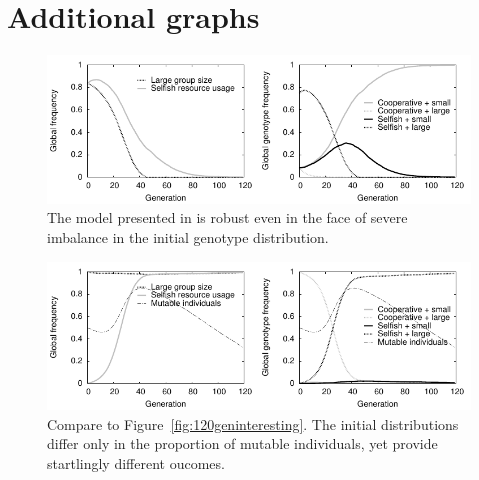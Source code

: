\documentclass[11pt]{article}
\begin{document}
\section{Additional graphs}
\label{app:graphs}
\vspace{-.5cm}
\begin{figure}[!ht]
  \centering
  \includegraphics{unevenplot.pdf}
  \caption{The model presented in \citet{orig} is robust even in the face of severe imbalance in the initial genotype distribution.}
  \label{fig:unevenplot}
\end{figure}
\vspace{-.5cm}
\begin{figure}[!ht]
  \centering
  \includegraphics{further1.pdf}
  \caption{Compare to Figure~\ref{fig:120geninteresting}. The initial distributions differ only in the proportion of mutable individuals, yet provide startlingly different oucomes.}
  \label{fig:sizeplot}
\end{figure}


\end{document}
